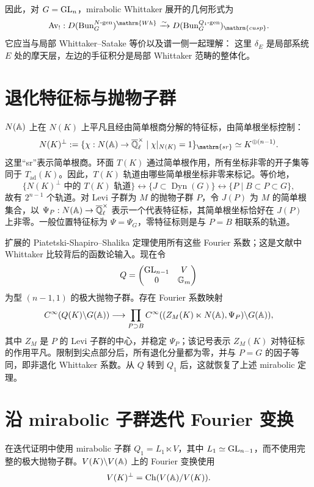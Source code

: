 因此，对 $G=\operatorname{GL}_n$，mirabolic Whittaker 展开的几何形式为
\[\Av_!:D(\Bun_G^{N\text{-gen}})^{\mathrm{Wh}}\xrightarrow{\sim}D(\Bun_G^{Q_1\text{-gen}})_{\mathrm{cusp}}.\]
它应当与局部 Whittaker–Satake 等价以及谱一侧一起理解：
这里 $\delta_E$ 是局部系统 $E$ 处的摩天层，左边的手征积分是局部 Whittaker 范畴的整体化。
\section{退化特征标与抛物子群}\label{sec:3.8}
$N(\mathbb{A})$ 上在 $N(K)$ 上平凡且经由简单根商分解的特征标，由简单根坐标控制：
\[N(K)^\perp:=\{\chi:N(\A)\to\Qell^\times\mid\chi|_{N(K)}=1\}_{\mathrm{sr}}\simeq K^{\oplus(n-1)}.\]
这里“sr”表示简单根商。环面 $T(K)$ 通过简单根作用，所有坐标非零的开子集等同于 $T_{\mathrm{ad}}(K)$。因此，$T(K)$ 轨道由哪些简单根坐标非零来标记。等价地，
\[\{N(K)^\perp\text{ 中的 }T(K)\text{ 轨道}\}\longleftrightarrow\{J\subset\operatorname{Dyn}(G)\}\longleftrightarrow\{P\mid B\subset P\subset G\},\]
故有 $2^{n-1}$ 个轨道。对 Levi 子群为 $M$ 的抛物子群 $P$，令 $J(P)$ 为 $M$ 的简单根集合，以 $\Psi_P:N(\mathbb{A})\to\overline{\mathbb{Q}}_{\ell}^\times$ 表示一个代表特征标，其简单根坐标恰好在 $J(P)$ 上非零。一般位置特征标为 $\Psi=\Psi_G$，零特征标则是与 $P=B$ 相联系的轨道。

扩展的 Piatetski-Shapiro–Shalika 定理使用所有这些 Fourier 系数；这是文献\cite{FGKV98}中 Whittaker 比较背后的函数论输入。现在令
\[Q=\begin{pmatrix}\operatorname{GL}_{n-1}&V\\0&\mathbb{G}_{m}\end{pmatrix}\]
为型 $(n-1,1)$ 的极大抛物子群。存在 Fourier 系数映射
\[C^\infty(Q(K)\backslash G(\mathbb{A}))\longrightarrow\prod_{P\supset B}C^\infty((Z_M(K)\ltimes N(\mathbb{A}),\Psi_P)\backslash G(\mathbb{A})),\]
其中 $Z_M$ 是 $P$ 的 Levi 子群的中心，并稳定 $\Psi_P$；该记号表示 $Z_M(K)$ 对特征标的作用平凡。限制到尖点部分后，所有退化分量都为零，并与 $P=G$ 的因子等同，即非退化 Whittaker 系数。从 $Q$ 转到 $Q_1$ 后，这就恢复了上述 mirabolic 定理。
\section{沿 mirabolic 子群迭代 Fourier 变换}\label{sec:3.9}
在迭代证明中使用 mirabolic 子群 $Q_1=L_1\ltimes V$，其中 $L_1\simeq\operatorname{GL}_{n-1}$，而不使用完整的极大抛物子群。$V(K)\backslash V(\mathbb{A})$ 上的 Fourier 变换使用
\[V(K)^\perp=\operatorname{Ch}(V(\mathbb{A})/V(K)).\]

